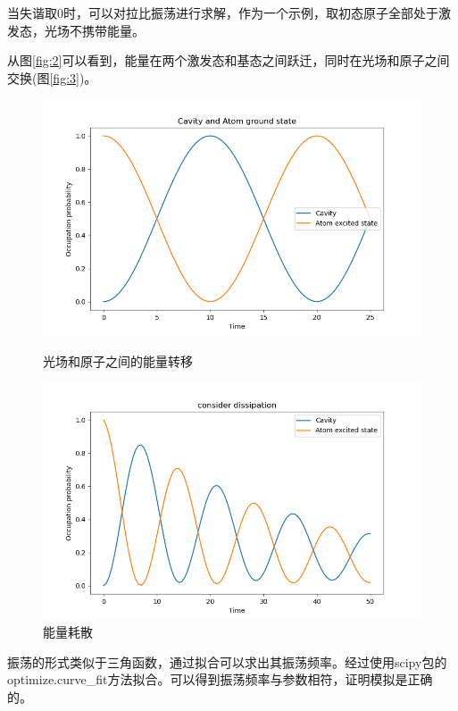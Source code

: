 \documentclass{ctexart}
\begin{document}
当失谐取0时，可以对拉比振荡进行求解，作为一个示例，取初态原子全部处于激发态，光场不携带能量。

从图\ref{fig:2}可以看到，能量在两个激发态和基态之间跃迁，同时在光场和原子之间交换(图\ref{fig:3})。
\begin{figure}[htbp]
    \begin{minipage}[t]{0.5\linewidth}
        \centering
        \includegraphics[width=1.0\linewidth]{3.png}
        \caption{光场和原子之间的能量转移}
        \label{fig:3}
    \end{minipage}    
    \begin{minipage}[t]{0.5\linewidth}
        \centering
        \includegraphics[width=1.0\linewidth]{6.png}
        \caption{能量耗散}
        \label{fig:6}
    \end{minipage}
\end{figure}
振荡的形式类似于三角函数，通过拟合可以求出其振荡频率。经过使用scipy包的optimize.curve\_fit方法拟合。可以得到振荡频率与参数相符，证明模拟是正确的。
\end{document}
